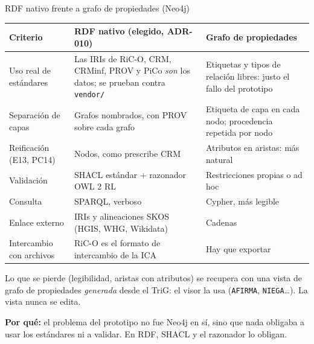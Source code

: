 \documentclass[aspectratio=169,10pt]{beamer}
\newcommand{\ttt}[1]{\texttt{\small #1}}
\newcommand{\porque}[1]{\par\smallskip\colorbox{ocre!10}{\parbox{\dimexpr\linewidth-2\fboxsep}{\footnotesize\textbf{Por qué:} #1}}}
\begin{document}
\begin{frame}{RDF nativo frente a grafo de propiedades (Neo4j)}
\scriptsize
\begin{tabular}{@{}p{2.8cm}p{5.2cm}p{5.2cm}@{}}
\toprule
Criterio & RDF nativo (\alert{elegido}, ADR-010) & Grafo de propiedades \\
\midrule
Uso real de estándares & Las IRIs de RiC-O, CRM, CRMinf, PROV y PiCo \emph{son} los datos; se prueban contra \ttt{vendor/} & Etiquetas y tipos de relación libres: justo el fallo del prototipo \\
Separación de capas & Grafos nombrados, con PROV sobre cada grafo & Etiqueta de capa en cada nodo; procedencia repetida por nodo \\
Reificación (E13, PC14) & Nodos, como prescribe CRM & Atributos en aristas: \alert{más natural} \\
Validación & SHACL estándar + razonador OWL 2 RL & Restricciones propias o ad hoc \\
Consulta & SPARQL, verboso & Cypher, \alert{más legible} \\
Enlace externo & IRIs y alineaciones SKOS (HGIS, WHG, Wikidata) & Cadenas \\
Intercambio con archivos & RiC-O es el formato de intercambio de la ICA & Hay que exportar \\
\bottomrule
\end{tabular}

\medskip
\small Lo que se pierde (legibilidad, aristas con atributos) se recupera con una \alert{vista} de grafo de propiedades
\emph{generada} desde el TriG: el visor la usa (\ttt{AFIRMA}, \ttt{NIEGA}…). La vista nunca se edita.
\porque{el problema del prototipo no fue Neo4j en sí, sino que nada obligaba a usar los estándares ni a validar. En RDF,
SHACL y el razonador lo obligan.}
\end{frame}
\end{document}
